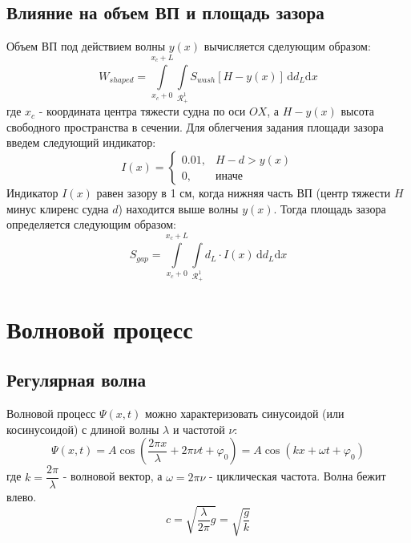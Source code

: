\documentclass{article}%
\numberwithin{equation}{subsection}
\let\oldsection\section%
\renewcommand{\section}{%
  \renewcommand{\theequation}{\thesection.\arabic{equation}}%
  \oldsection}%
\let\oldsubsection\subsection%
\renewcommand{\subsection}{%
  \renewcommand{\theequation}{\thesubsection.\arabic{equation}}%
  \oldsubsection}%
\begin{document}
\subsection{Влияние на объем ВП и площадь зазора}
Объем ВП под действием волны $y(x)$ вычисляется сделующим образом:
\begin{equation}
    W_{shaped} = \int\limits_{x_c + 0}^{x_c + L}\int\limits_{\mathcal{R}_{+}^{1}}S_{wash}\left[H - y(x)\right]\,\mathrm{d}d_L\mathrm{d}x
\end{equation}
где $x_c$ - координата центра тяжести судна по оси $OX$, а $H-y(x)$ высота свободного пространства в сечении. Для облегчения задания площади зазора введем следующий индикатор:
\begin{equation}
    I(x) = 
    \begin{cases*}
        0.01, &H-d > y(x)\\
        0,&\text{иначе}
    \end{cases*}
\end{equation}
Индикатор $I(x)$ равен зазору в 1 см, когда нижняя часть ВП (центр тяжести $H$ минус клиренс судна $d$) находится выше волны $y(x)$. Тогда площадь зазора определяется следующим образом:
\begin{equation}
    S_{gap} = \int\limits_{x_c + 0}^{x_c + L}\int\limits_{\mathcal{R}_{+}^{1}}d_L \cdot I(x)\,\mathrm{d}d_L\mathrm{d}x
\end{equation}

\section{Волновой процесс}
\subsection{Регулярная волна}
Волновой процесс $\Psi(x, t)$ можно характеризовать синусоидой (или косинусоидой) с длиной волны $\lambda$ и частотой $\nu$:
\begin{equation}
    \Psi(x, t) = A \cos(\dfrac{2\pi x}{\lambda}+2\pi \nu t + \varphi_0) = A \cos(kx + \omega t + \varphi_0)
\end{equation}
где $k=\dfrac{2\pi}{\lambda}$ - волновой вектор, а $\omega=2\pi\nu$ - циклическая частота. Волна бежит влево.
\begin{equation}
    c = \sqrt{\frac{\lambda}{2\pi}g}=\sqrt{\dfrac{g}{k}}
\end{equation}
\end{document}
